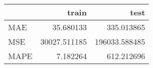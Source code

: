 \begin{tabular}{lrr}
\toprule
{} &         train &           test \\
\midrule
MAE  &     35.680133 &     335.013865 \\
MSE  &  30027.511185 &  196033.588485 \\
MAPE &      7.182264 &     612.212696 \\
\bottomrule
\end{tabular}
